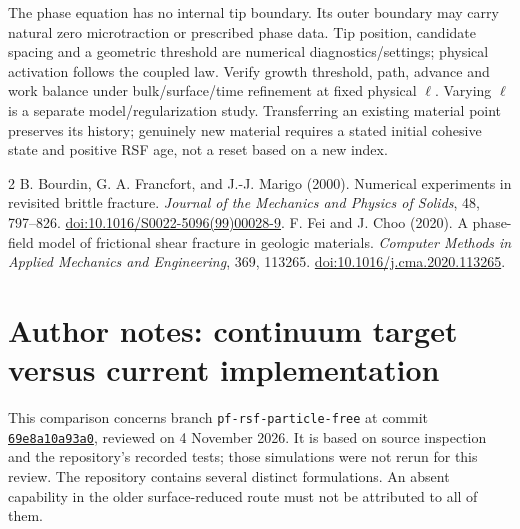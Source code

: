 \documentclass[10pt,a4paper]{article}
\begin{document}
The phase equation has no internal tip boundary. Its outer boundary may carry
natural zero microtraction or prescribed phase data. Tip position, candidate
spacing and a geometric threshold are numerical diagnostics/settings; physical
activation follows the coupled law. Verify growth threshold, path, advance and
work balance under bulk/surface/time refinement at fixed physical $\ell$.
Varying $\ell$ is a separate model/regularization study. Transferring an existing
material point preserves its history; genuinely new material requires a stated
initial cohesive state and positive RSF age, not a reset based on a new index.

\begin{thebibliography}{2}
B. Bourdin, G. A. Francfort, and J.-J. Marigo (2000).
Numerical experiments in revisited brittle fracture.
\textit{Journal of the Mechanics and Physics of Solids}, 48, 797--826.
\href{https://doi.org/10.1016/S0022-5096(99)00028-9}
{doi:10.1016/S0022-5096(99)00028-9}.
F. Fei and J. Choo (2020).
A phase-field model of frictional shear fracture in geologic materials.
\textit{Computer Methods in Applied Mechanics and Engineering}, 369, 113265.
\href{https://doi.org/10.1016/j.cma.2020.113265}
{doi:10.1016/j.cma.2020.113265}.
\end{thebibliography}

\clearpage
\begingroup
\small
\setlength{\parskip}{3pt}
\section*{Author notes: continuum target versus current implementation}

This comparison concerns branch \texttt{pf-rsf-particle-free} at commit
\href{https://github.com/YiminJin/aspect/tree/69e8a10a93a08718d31af961197899e320657c04}
{\texttt{69e8a10a93a0}}, reviewed on 4 November 2026. It is based on source
inspection and the repository's recorded tests; those simulations were not rerun
for this review. The repository contains several distinct formulations. An
absent capability in the older surface-reduced route must not be attributed to
all of them.
\end{document}

